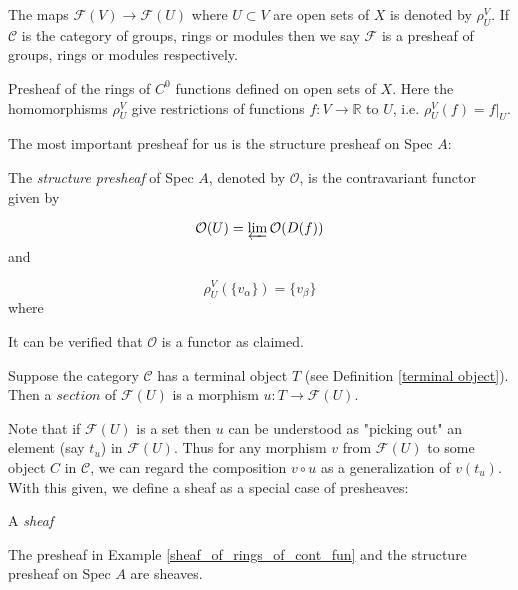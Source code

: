 \documentclass[ag.tex]{subfiles}
\begin{document}
The maps $\mathcal{F}(V) \to \mathcal{F}(U)$ where $U \subset V$ are open sets of $X$ is denoted by $\rho_U^V$.  If $\mathcal{C}$ is the category of groups, rings or modules then we say $\mathcal{F}$ is a presheaf of groups, rings or modules respectively. 

\begin{exmp}\label{sheaf_of_rings_of_cont_fun}
Presheaf of the rings of $C^0$ functions defined on open sets of $X$. Here the homomorphisms $\rho_U^V$ give restrictions of functions $f: V \to \mathbb{R}$ to $U$, i.e.  $\rho_U^V (f) = f|_{U}$.
\end{exmp}

The most important presheaf for us is the structure presheaf on Spec $A$:

\begin{definition}
The \textit{structure presheaf} of Spec $A$, denoted by $\mathcal{O}$,  is the contravariant functor given by 

\begin{equation}
\mathcal{O}(U) = \varprojlim \mathcal{O}(D(f))
\end{equation}
and 

\begin{equation}
\rho_U^V(\{v_\alpha\}) = \{v_\beta\}
\end{equation}
where 
\end{definition}

It can be verified that $\mathcal{O}$ is a functor as claimed.  

\begin{definition}
Suppose the category $\mathcal{C}$ has a terminal object $T$ (see Definition \ref{terminal object}).  Then a $\textit{section}$ of $\mathcal{F}(U)$ is a morphism $u: T \to \mathcal{F}(U)$.
\end{definition}

Note that if $\mathcal{F}(U)$ is a set then $u$ can be understood as "picking out" an element (say $t_u$) in $\mathcal{F}(U)$.  Thus for any morphism $v$ from $\mathcal{F}(U)$ to some object $C$ in $\mathcal{C}$,  we can regard the composition $v \circ u$ as a generalization of $v(t_u)$. With this given, we define a sheaf as a special case of presheaves:

\begin{definition}
A \textit{sheaf} 
\end{definition}

\begin{exmp}
The presheaf in Example \ref{sheaf_of_rings_of_cont_fun} and the structure presheaf on Spec $A$ are sheaves.
\end{exmp}
\end{document}
